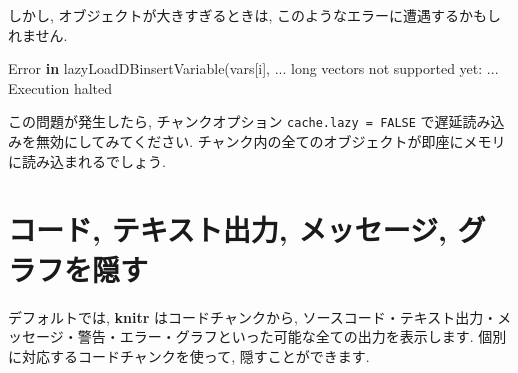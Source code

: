 \documentclass[
  11pt,
  lualatex,ja=standard,jafont=noto]{bxjsreport}
\newenvironment{Shaded}{\begin{snugshade}}{\end{snugshade}}
\newcommand{\ControlFlowTok}[1]{\textcolor[rgb]{0.13,0.29,0.53}{\textbf{#1}}}
\newcommand{\FunctionTok}[1]{\textcolor[rgb]{0.00,0.00,0.00}{#1}}
\newcommand{\NormalTok}[1]{#1}
\newcommand{\SpecialCharTok}[1]{\textcolor[rgb]{0.00,0.00,0.00}{#1}}
\begin{document}
しかし, オブジェクトが大きすぎるときは, このようなエラーに遭遇するかもしれません.

\begin{Shaded}
\begin{Highlighting}[]
\NormalTok{Error }\ControlFlowTok{in} \FunctionTok{lazyLoadDBinsertVariable}\NormalTok{(vars[i], ... }
\NormalTok{  long vectors not supported yet}\SpecialCharTok{:}\NormalTok{ ...}
\NormalTok{Execution halted}
\end{Highlighting}
\end{Shaded}

この問題が発生したら, チャンクオプション \texttt{cache.lazy = FALSE} で遅延読み込みを無効にしてみてください. チャンク内の全てのオブジェクトが即座にメモリに読み込まれるでしょう.

\hypertarget{hide-one}{%
\section{コード, テキスト出力, メッセージ, グラフを隠す}\label{hide-one}}

デフォルトでは, \textbf{knitr} はコードチャンクから, ソースコード・テキスト出力・メッセージ・警告・エラー・グラフといった可能な全ての出力を表示します. 個別に対応するコードチャンクを使って, 隠すことができます.
\end{document}
